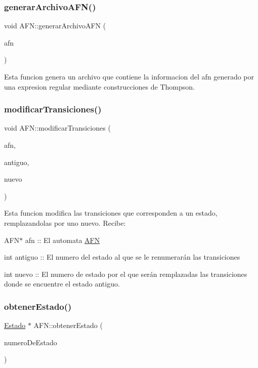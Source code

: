 \subsubsection{\texorpdfstring{generar\+Archivo\+A\+F\+N()}{generarArchivoAFN()}}
{\footnotesize\ttfamily void A\+F\+N\+::generar\+Archivo\+A\+FN (\begin{DoxyParamCaption}\item[{\hyperlink{class_a_f_n}{A\+FN}}]{afn }\end{DoxyParamCaption})}

Esta funcion genera un archivo que contiene la informacion del afn generado por una expresion regular mediante construcciones de Thompson. \mbox{\label{class_a_f_n_a88e43b61c88b0fa50babdc343b432166}} 
\subsubsection{\texorpdfstring{modificar\+Transiciones()}{modificarTransiciones()}}
{\footnotesize\ttfamily void A\+F\+N\+::modificar\+Transiciones (\begin{DoxyParamCaption}\item[{\hyperlink{class_a_f_n}{A\+FN} $\ast$}]{afn,  }\item[{int}]{antiguo,  }\item[{int}]{nuevo }\end{DoxyParamCaption})}

Esta funcion modifica las transiciones que corresponden a un estado, remplazandolas por uno nuevo. Recibe\+:
\begin{DoxyItemize}
\item A\+F\+N$\ast$ afn \+:\+: El automata \hyperlink{class_a_f_n}{A\+FN}
\item int antiguo \+:\+: El numero del estado al que se le renumerarán las transiciones
\item int nuevo \+:\+: El numero de estado por el que serán remplazadas las transiciones donde se encuentre el estado antiguo. 
\end{DoxyItemize}\mbox{\label{class_a_f_n_af6cb39f268a7722d65452b790349211d}} 
\subsubsection{\texorpdfstring{obtener\+Estado()}{obtenerEstado()}}
{\footnotesize\ttfamily \hyperlink{class_estado}{Estado} $\ast$ A\+F\+N\+::obtener\+Estado (\begin{DoxyParamCaption}\item[{int}]{numero\+De\+Estado }\end{DoxyParamCaption})}

